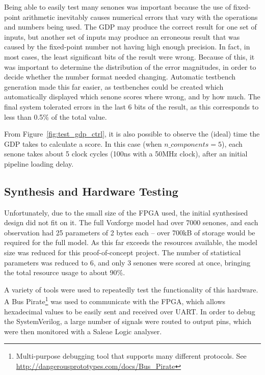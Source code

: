 	Being able to easily test many senones was important because the use of fixed-point arithmetic inevitably causes numerical errors that vary with the operations and numbers being used.  The GDP may produce the correct result for one set of inputs, but another set of inputs may produce an erroneous result that was caused by the fixed-point number not having high enough precision.  In fact, in most cases, the least significant bits of the result were wrong.  Because of this, it was important to determine the distribution of the error magnitudes, in order to decide whether the number format needed changing.  Automatic testbench generation made this far easier, as testbenches could be created which automatically displayed which senone scores where wrong, and by how much.  The final system tolerated errors in the last 6 bits of the result, as this corresponds to less than 0.5\% of the total value.


	From Figure~\ref{fig:test_gdp_ctrl}, it is also possible to observe the (ideal) time the GDP takes to calculate a score.  In this case (when $n\_components=5$), each senone takes about 5 clock cycles (100ns with a 50MHz clock), after an initial pipeline loading delay.

	\subsection{Synthesis and Hardware Testing} %
	\label{sub:gdp_synthesis_and_hardware_testing}
		Unfortunately, due to the small size of the FPGA used, the initial synthesised design did not fit on it.  The full Voxforge model had over 7000 senones, and each observation had 25 parameters of 2 bytes each -- over 700kB of storage would be required for the full model.  As this far exceeds the resources available, the model size was reduced for this proof-of-concept project.  The number of statistical parameters was reduced to 6, and only 3 senones were scored at once, bringing the total resource usage to about 90\%.  %

		A variety of tools were used to repeatedly test the functionality of this hardware.  A Bus Pirate\footnote{Multi-purpose debugging tool that supports many different protocols.  See \href{http://dangerousprototypes.com/docs/Bus_Pirate}{http://dangerousprototypes.com/docs/Bus_Pirate}} was used to communicate with the FPGA, which allows hexadecimal values to be easily sent and received over UART.  In order to debug the SystemVerilog, a large number of signals were routed to output pins, which were then monitored with a Saleae Logic analyser.


